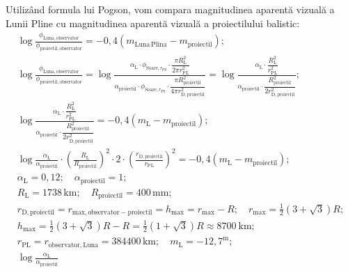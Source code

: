 \begin{description}
  Utiliz\^and formula lui Pogson, vom compara magnitudinea aparent\u{a}
  vizual\u{a} a Lunii Pline cu magnitudinea aparent\u{a} vizual\u{a} a
  proiectilului balistic:
  \begin{gather*}
    \log\frac{\phi_{\mathrm{Luna,observator}}}
      {\phi_{\mathrm{proiectil,observator}}}
      = -0{,}4\left(m_{\mathrm{Luna\,Plina}}
        - m_{\mathrm{proiectil}}\right); \\
    \log\frac{\phi_{\mathrm{Luna,observator}}}
      {\phi_{\mathrm{proiectil,observator}}}
      = \log\frac{\alpha_{\mathrm{L}}\cdot
        \phi_{\mathrm{Soare},r_{\mathrm{PS}}}\cdot
        \dfrac{\pi R_{\mathrm{L}}^2}{2\pi r_{\mathrm{PL}}^2}}
        {\alpha_{\mathrm{proiectil}}\cdot
        \phi_{\mathrm{Soare},r_{\mathrm{PS}}}\cdot
        \dfrac{\pi R_{\mathrm{proiectil}}^2}
          {4\pi r_{\mathrm{D,proiectil}}^2}}
      = \log\frac{\alpha_{\mathrm{L}}\cdot
        \dfrac{R_{\mathrm{L}}^2}{r_{\mathrm{PL}}^2}}
        {\alpha_{\mathrm{proiectil}}\cdot
        \dfrac{R_{\mathrm{proiectil}}^2}{2r_{\mathrm{D,proiectil}}^2}}; \\
    \log\frac{\alpha_{\mathrm{L}}\cdot
      \dfrac{R_{\mathrm{L}}^2}{r_{\mathrm{PL}}^2}}
      {\alpha_{\mathrm{proiectil}}\cdot
      \dfrac{R_{\mathrm{proiectil}}^2}{2r_{\mathrm{D,proiectil}}^2}}
      = -0{,}4\left(m_{\mathrm{L}} - m_{\mathrm{proiectil}}\right); \\
    \log\frac{\alpha_{\mathrm{L}}}{\alpha_{\mathrm{proiectil}}}\cdot
      \left(\frac{R_{\mathrm{L}}}{R_{\mathrm{proiectil}}}\right)^2\cdot
      2\cdot\left(\frac{r_{\mathrm{D,proiectil}}}{r_{\mathrm{PL}}}\right)^2
      = -0{,}4\left(m_{\mathrm{L}} - m_{\mathrm{proiectil}}\right); \\
    \alpha_{\mathrm{L}} = 0{,}12;\quad \alpha_{\mathrm{proiectil}} = 1; \\
    R_{\mathrm{L}} = 1738\,\mathrm{km};\quad
      R_{\mathrm{proiectil}} = 400\,\mathrm{mm}; \\
    r_{\mathrm{D,proiectil}}
      = r_{\mathrm{max,observator-proiectil}} = h_{\max}
      = r_{\max} - R;\quad
      r_{\max} = \frac{1}{2}\left(3 + \sqrt{3}\right)R; \\
    h_{\max} = \frac{1}{2}\left(3 + \sqrt{3}\right)R - R
      = \frac{1}{2}\left(1 + \sqrt{3}\right)R \approx 8700\ \mathrm{km}; \\
    r_{\mathrm{PL}} = r_{\mathrm{observator,Luna}} = 384400\,\mathrm{km};\quad
      m_{\mathrm{L}} = -12{,}7^{\mathrm{m}}; \\
    \log\frac{\alpha_{\mathrm{L}}}{\alpha_{\mathrm{proiectil}}}

\end{gather*}
\end{description}
